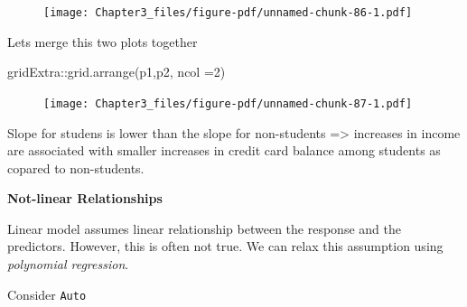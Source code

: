 \documentclass[
  letterpaper,
  DIV=11,
  numbers=noendperiod]{scrreprt}
\newenvironment{Shaded}{\begin{snugshade}}{\end{snugshade}}
\newcommand{\AttributeTok}[1]{\textcolor[rgb]{0.65,0.35,0.00}{#1}}
\newcommand{\DecValTok}[1]{\textcolor[rgb]{0.47,0.16,0.63}{#1}}
\newcommand{\FunctionTok}[1]{\textcolor[rgb]{0.02,0.16,0.49}{#1}}
\newcommand{\NormalTok}[1]{\textcolor[rgb]{0.33,0.33,0.33}{#1}}
\newcommand{\SpecialCharTok}[1]{\textcolor[rgb]{0.00,0.46,0.62}{#1}}
\begin{document}
\begin{figure}[H]

{\centering \texttt{[image: Chapter3\_files/figure-pdf/unnamed-chunk-86-1.pdf]}

}

\end{figure}

Lets merge this two plots together

\begin{Shaded}
\begin{Highlighting}[]
\NormalTok{gridExtra}\SpecialCharTok{::}\FunctionTok{grid.arrange}\NormalTok{(p1,p2, }\AttributeTok{ncol =}\DecValTok{2}\NormalTok{)}
\end{Highlighting}
\end{Shaded}

\begin{figure}[H]

{\centering \texttt{[image: Chapter3\_files/figure-pdf/unnamed-chunk-87-1.pdf]}

}

\end{figure}

Slope for studens is lower than the slope for non-students
=\textgreater{} increases in income are associated with smaller
increases in credit card balance among students as copared to
non-students.

\textbf{Not-linear Relationships}

Linear model assumes linear relationship between the response and the
predictors. However, this is often not true. We can relax this
assumption using \emph{polynomial regression}.

Consider \texttt{Auto}
\end{document}
